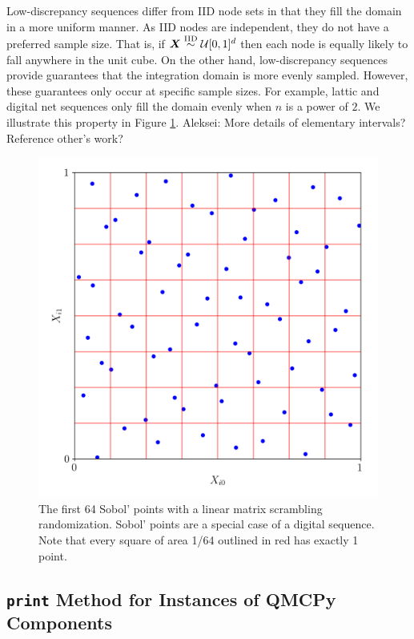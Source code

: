 \documentclass[graybox,footinfo]{svmult}
\newcommand{\AGSComment}[1]{{\color{cyan} Aleksei: #1}}
\newcommand{\IID}{\textup{IID}}
\newcommand{\IIDsim}{\overset{\IID}{\sim}}
\begin{document}
Low-discrepancy sequences differ from IID node sets in that they fill the domain in a more uniform manner. As IID nodes are independent, they do not have a preferred sample size. That is, if $\bsX \IIDsim \calU[0,1]^d$ then each node is equally likely to fall  anywhere in the unit cube. On the other hand, low-discrepancy sequences provide guarantees that the integration domain is more evenly sampled. However, these guarantees only occur at specific sample sizes. For example, lattic and digital net sequences only fill the domain evenly when $n$ is a power of $2$. We illustrate this property in Figure \ref{fig:digitalNet_elementary_intervals}. \AGSComment{More details of elementary intervals? Reference other's work?}
\begin{figure}
	\centering
	\includegraphics[width=1\textwidth]{QMCSoftwareArticle/figs/dd_sobol_elementary_intervals.png} 
	\caption{The first 64 Sobol' points with a linear matrix scrambling randomization. Sobol' points are a special case of a digital sequence. Note that every square of area 1/64 outlined in red has exactly 1 point. }
	\label{fig:digitalNet_elementary_intervals}
\end{figure}

\subsection{\texttt{print} Method for Instances of QMCPy Components}
\end{document}
